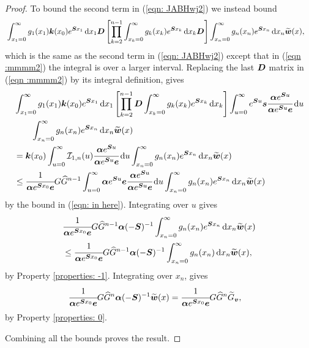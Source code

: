 \begin{proof}
To bound the second term in (\ref{eqn: JABHwj2}) we instead bound 
	\begin{align}
		&\int_{x_1=0}^\infty g_1(x_1) \boldsymbol k(x_0) e^{\boldsymbol{S}x_1}\, \mathrm{d} x_1\boldsymbol D 
            	\left[\prod_{k=2}^{n-1}\int_{x_k=0}^\infty g_k(x_k) e^{\boldsymbol{S}x_k} \, \mathrm{d} x_k \boldsymbol D\right] \int_{x_n=0}^\infty g_{n}(x_n) e^{\boldsymbol{S}x_n} \, \mathrm{d} x_n \widetilde{\boldsymbol w}(x), 
		\label{eqn :mmmm2}
	\end{align}
	which is the same as the second term in (\ref{eqn: JABHwj2}) except that in (\ref{eqn :mmmm2}) the integral is over a larger interval. Replacing the last \(\boldsymbol D\) matrix in (\ref{eqn :mmmm2}) by its integral definition, gives 
	\begin{align*}
		&\int_{x_1=0}^\infty g_1(x_1) \boldsymbol k(x_0) e^{\boldsymbol{S}x_1}\, \mathrm{d} x_1
            \left[\prod_{k=2}^{n-1}\boldsymbol D \int_{x_k=0}^\infty g_k(x_k) e^{\boldsymbol{S}x_k} \, \mathrm{d} x_k \right] \int_{u=0}^\infty e^{\boldsymbol S u}\boldsymbol s \cfrac{\boldsymbol \alpha e^{\boldsymbol S u}}{\boldsymbol \alpha e^{\boldsymbol S u} \boldsymbol e}\, \mathrm{d} u 
			\\&\qquad{}\int_{x_n=0}^\infty g_{n}(x_n) e^{\boldsymbol{S}x_n} \, \mathrm{d} x_n \widetilde{\boldsymbol w}(x) 
		\\&=\boldsymbol k(x_0) \int_{u=0}^\infty \mathcal I_{1,n}(u) \cfrac{\boldsymbol \alpha e^{\boldsymbol S u}}{\boldsymbol \alpha e^{\boldsymbol S u} \boldsymbol e}\, \mathrm{d} u \int_{x_n=0}^\infty g_{n}(x_n) e^{\boldsymbol{S}x_n} \, \mathrm{d} x_n \widetilde{\boldsymbol w}(x) 
		\\&\leq \cfrac{1}{\boldsymbol \alpha e^{\boldsymbol{S}x_0}\boldsymbol e}G\widehat G^{n-1} \int_{u=0}^\infty \boldsymbol \alpha e^{\boldsymbol{S}u}\boldsymbol e \cfrac{\boldsymbol \alpha e^{\boldsymbol S u}}{\boldsymbol \alpha e^{\boldsymbol S u} \boldsymbol e}\, \mathrm{d} u \int_{x_n=0}^\infty g_{n}(x_n) e^{\boldsymbol{S}x_n} \, \mathrm{d} x_n \widetilde{\boldsymbol w}(x) 
	\end{align*}
	by the bound in (\ref{eqn: in here}). Integrating over \(u\) gives 
	\begin{align*}
		&\cfrac{1}{\boldsymbol \alpha e^{\boldsymbol{S}x_0}\boldsymbol e}G\widehat G^{n-1} \boldsymbol \alpha (-\boldsymbol S)^{-1} \int_{x_n=0}^\infty g_{n}(x_n) e^{\boldsymbol{S}x_n} \, \mathrm{d} x_n \widetilde{\boldsymbol w}(x) 
		\\&\leq \cfrac{1}{\boldsymbol \alpha e^{\boldsymbol{S}x_0}\boldsymbol e}G\widehat G^{n-1} \boldsymbol \alpha (-\boldsymbol S)^{-1} \int_{x_n=0}^\infty g_{n}(x_n) \, \mathrm{d} x_n \widetilde{\boldsymbol w}(x),
	\end{align*}
	by Property \ref{properties: -1}. Integrating over \(x_n\), gives
	\begin{align}
		\cfrac{1}{\boldsymbol \alpha e^{\boldsymbol{S}x_0}\boldsymbol e}G\widehat G^{n} \boldsymbol \alpha (-\boldsymbol S)^{-1} \widetilde{\boldsymbol w}(x) 
		&=\cfrac{1}{\boldsymbol \alpha e^{\boldsymbol{S}x_0}\boldsymbol e}G\widehat G^{n}\widetilde G_{\boldsymbol v},\label{eqn:FGHJSjjs sj}
	\end{align}
	by Property \ref{properties: 0}.

	Combining all the bounds proves the result. 
\end{proof}	
